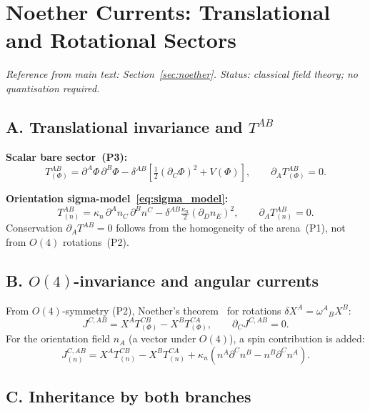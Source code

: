 \documentclass[11pt,a4paper]{article}
\numberwithin{equation}{section}
\begin{document}
\section{Noether Currents: Translational and Rotational Sectors}
\label{app:noether_full}

\textit{Reference from main text: Section~\ref{sec:noether}.
Status: classical field theory; no quantisation required.}

\subsection*{A. Translational invariance and $T^{AB}$}

\noindent\textbf{Scalar bare sector~(P3):}
\begin{equation}
  T^{AB}_{(\Phi)}=\partial^A\Phi\,\partial^B\Phi
  -\delta^{AB}\!\left[\tfrac{1}{2}(\partial_C\Phi)^2+V(\Phi)\right],
  \qquad\partial_A T^{AB}_{(\Phi)}=0.
\end{equation}

\noindent\textbf{Orientation sigma-model~\eqref{eq:sigma_model}:}
\begin{equation}
  T^{AB}_{(n)}=\kappa_n\,\partial^A n_C\,\partial^B n^C
  -\delta^{AB}\tfrac{\kappa_n}{2}(\partial_D n_E)^2,
  \qquad\partial_A T^{AB}_{(n)}=0.
\end{equation}
Conservation $\partial_A T^{AB}=0$ follows from the homogeneity
of the arena~(P1), not from $O(4)$ rotations~(P2).

\subsection*{B. $O(4)$-invariance and angular currents}

From $O(4)$-symmetry (P2), Noether's theorem~\cite{Noether1918}
for rotations $\delta X^A=\omega^A{}_B X^B$:
\begin{equation}
  J^{C,AB}=X^A T^{CB}_{(\Phi)}-X^B T^{CA}_{(\Phi)},
  \qquad\partial_C J^{C,AB}=0.
\end{equation}
For the orientation field $n_A$ (a vector under $O(4)$),
a spin contribution is added:
\begin{equation}
  J^{C,AB}_{(n)}=X^A T^{CB}_{(n)}-X^B T^{CA}_{(n)}
  +\kappa_n(n^A\partial^C n^B-n^B\partial^C n^A).
\end{equation}

\subsection*{C. Inheritance by both branches}
\end{document}
